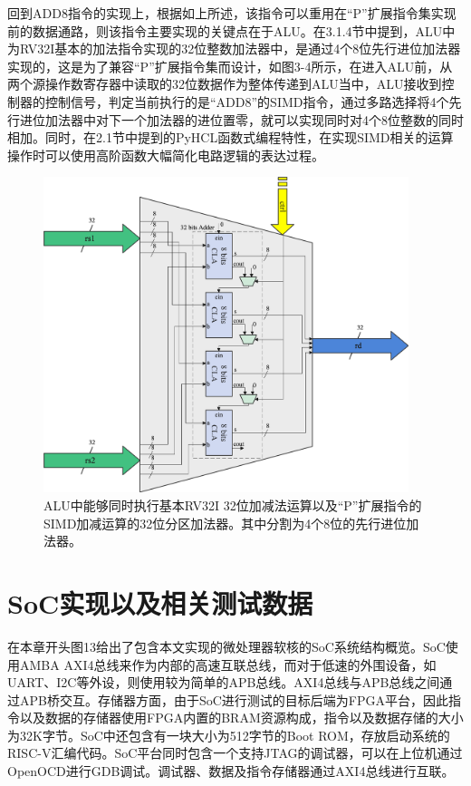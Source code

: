 回到ADD8指令的实现上，根据如上所述，该指令可以重用在“P”扩展指令集实现前的数据通路，则该指令主要实现的关键点在于ALU。在3.1.4节中提到，ALU中为RV32I基本的加法指令实现的32位整数加法器中，是通过4个8位先行进位加法器实现的，这是为了兼容“P”扩展指令集而设计，如图3-4所示，在进入ALU前，从两个源操作数寄存器中读取的32位数据作为整体传递到ALU当中，ALU接收到控制器的控制信号，判定当前执行的是“ADD8”的SIMD指令，通过多路选择将4个先行进位加法器中对下一个加法器的进位置零，就可以实现同时对4个8位整数的同时相加。同时，在2.1节中提到的PyHCL函数式编程特性，在实现SIMD相关的运算操作时可以使用高阶函数大幅简化电路逻辑的表达过程。

\begin{figure}[htbp]
	\centering
	\includegraphics[width=0.95\textwidth]{Photos/ADD8.png}
	\caption{ALU中能够同时执行基本RV32I 32位加减法运算以及“P”扩展指令的SIMD加减运算的32位分区加法器。其中分割为4个8位的先行进位加法器。}
\end{figure}

\section{SoC实现以及相关测试数据}

在本章开头图13给出了包含本文实现的微处理器软核的SoC系统结构概览。SoC使用AMBA AXI4总线来作为内部的高速互联总线，而对于低速的外围设备，如UART、I2C等外设，则使用较为简单的APB总线。AXI4总线与APB总线之间通过APB桥交互。存储器方面，由于SoC进行测试的目标后端为FPGA平台，因此指令以及数据的存储器使用FPGA内置的BRAM资源构成，指令以及数据存储的大小为32K字节。SoC中还包含有一块大小为512字节的Boot ROM，存放启动系统的RISC-V汇编代码。SoC平台同时包含一个支持JTAG的调试器，可以在上位机通过OpenOCD进行GDB调试。调试器、数据及指令存储器通过AXI4总线进行互联。

